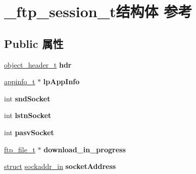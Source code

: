 \hypertarget{struct__ftp__session__t}{}\section{\+\_\+ftp\+\_\+session\+\_\+t结构体 参考}
\label{struct__ftp__session__t}
\subsection*{Public 属性}
\begin{DoxyCompactItemize}
\item 
\mbox{\label{struct__ftp__session__t_a106cba9a898c5a30207687868112f9dc}} 
\hyperlink{struct__object__header__t}{object\+\_\+header\+\_\+t} {\bfseries hdr}
\item 
\mbox{\label{struct__ftp__session__t_a9a7def535280d7563006d99e9959a5f8}} 
\hyperlink{structappinfo__t}{appinfo\+\_\+t} $\ast$ {\bfseries lp\+App\+Info}
\item 
\mbox{\label{struct__ftp__session__t_ab63f04aa6096bae9970908fbf360b385}} 
int {\bfseries snd\+Socket}
\item 
\mbox{\label{struct__ftp__session__t_a69f5821b3b0596b298c07d59155d3bc9}} 
int {\bfseries lstn\+Socket}
\item 
\mbox{\label{struct__ftp__session__t_a7b569d7698a65dc4a37e5602ff7b318c}} 
int {\bfseries pasv\+Socket}
\item 
\mbox{\label{struct__ftp__session__t_a54e79f11bec6f7f5ca71b6b2711fab7f}} 
\hyperlink{structftp__file__t}{ftp\+\_\+file\+\_\+t} $\ast$ {\bfseries download\+\_\+in\+\_\+progress}
\item 
\mbox{\label{struct__ftp__session__t_acd3e408fd77777c5d566d7c025adf27b}} 
\hyperlink{interfacestruct}{struct} \hyperlink{structsockaddr__in}{sockaddr\+\_\+in} {\bfseries socket\+Address}
\item 
\mbox{\label{struct__ftp__session__t_a96cbb52d8169a17e33c2885bb7fde769}} 

\end{DoxyCompactItemize}

